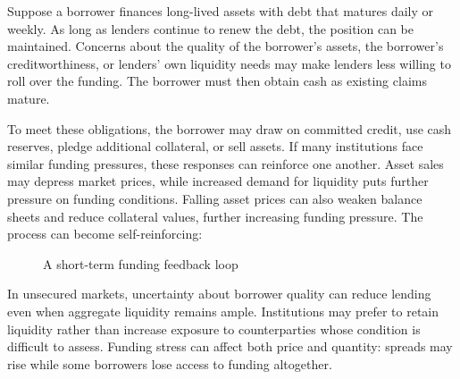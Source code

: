 Suppose a borrower finances long-lived assets with debt
that matures daily or weekly. As long as lenders continue
to renew the debt, the position can be maintained.
Concerns about the quality of the borrower's assets,
the borrower's creditworthiness, or lenders' own
liquidity needs may make lenders less willing to
roll over the funding. The borrower must then obtain cash
as existing claims mature.

To meet these obligations, the borrower may draw on
committed credit, use cash reserves, pledge additional
collateral, or sell assets. If many institutions face
similar funding pressures, these responses can reinforce
one another. Asset sales may depress market prices,
while increased demand for liquidity puts further
pressure on funding conditions. Falling asset prices
can also weaken balance sheets and reduce collateral
values, further increasing funding pressure. The process
can become self-reinforcing:


\begin{figure}[H]
\centering
{}
\caption{A short-term funding feedback loop}
\label{fig:ch7-funding-run-loop}
\end{figure}

In unsecured markets, uncertainty about borrower quality can reduce lending even when aggregate liquidity remains ample. Institutions may prefer to retain liquidity rather than increase exposure to counterparties whose condition is difficult to assess. Funding stress can affect both price and quantity: spreads may rise while some borrowers lose access to funding altogether.

